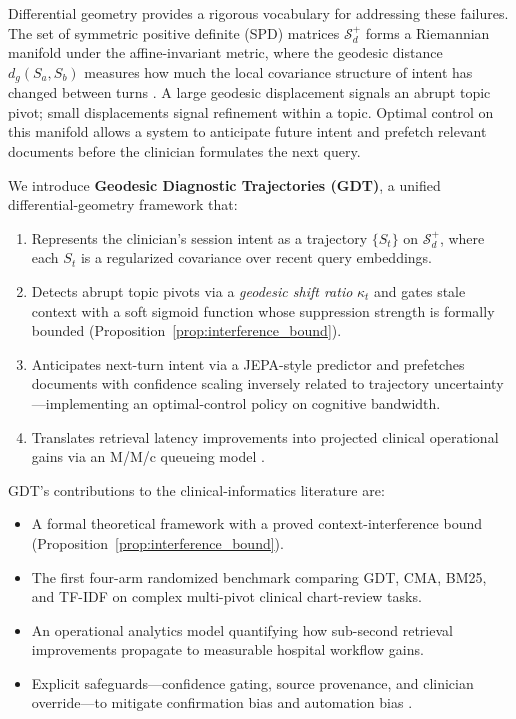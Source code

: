 \documentclass[11pt]{article}
\begin{document}
Differential geometry provides a rigorous vocabulary for addressing these failures. The set of symmetric positive definite (SPD) matrices $\mathcal{S}_d^+$ forms a Riemannian manifold under the affine-invariant metric, where the geodesic distance $d_g(S_a, S_b)$ measures how much the local covariance structure of intent has changed between turns \citep{pennec2006_spd}. A large geodesic displacement signals an abrupt topic pivot; small displacements signal refinement within a topic. Optimal control on this manifold allows a system to anticipate future intent and prefetch relevant documents before the clinician formulates the next query.

We introduce \textbf{Geodesic Diagnostic Trajectories (GDT)}, a unified differential-geometry framework that:
\begin{enumerate}
  \item Represents the clinician's session intent as a trajectory $\{S_t\}$ on $\mathcal{S}_d^+$, where each $S_t$ is a regularized covariance over recent query embeddings.
  \item Detects abrupt topic pivots via a \emph{geodesic shift ratio} $\kappa_t$ and gates stale context with a soft sigmoid function whose suppression strength is formally bounded (Proposition~\ref{prop:interference_bound}).
  \item Anticipates next-turn intent via a JEPA-style \citep{assran2023_ijepa} predictor and prefetches documents with confidence scaling inversely related to trajectory uncertainty---implementing an optimal-control policy on cognitive bandwidth.
  \item Translates retrieval latency improvements into projected clinical operational gains via an M/M/c queueing model \citep{kleinrock1975}.
\end{enumerate}

GDT's contributions to the clinical-informatics literature are:
\begin{itemize}
  \item A formal theoretical framework with a proved context-interference bound (Proposition~\ref{prop:interference_bound}).
  \item The first four-arm randomized benchmark comparing GDT, CMA, BM25, and TF-IDF on complex multi-pivot clinical chart-review tasks.
  \item An operational analytics model quantifying how sub-second retrieval improvements propagate to measurable hospital workflow gains.
  \item Explicit safeguards---confidence gating, source provenance, and clinician override---to mitigate confirmation bias and automation bias \citep{goddard2012}.
\end{itemize}
\end{document}
